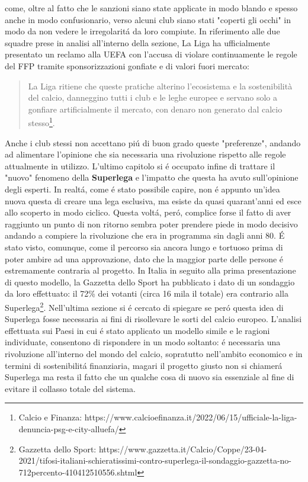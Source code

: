 \documentclass[
    corpo=12pt,
    oneside,
    evenboxes,
    tipotesi=triennale,
    stile=classica,
    oldstyle,
    autoretitolo,
    greek,
]{toptesi}
\begin{document}
\begin{interlinea}{1.5}
come, oltre al fatto che le sanzioni siano state applicate in modo blando e spesso anche in modo confusionario, verso alcuni club siano stati "coperti gli occhi" 
in modo da non vedere le irregolarit\'a da loro compiute. In riferimento alle due squadre prese in analisi all'interno della sezione, La Liga ha ufficialmente
presentato un reclamo alla UEFA con l'accusa di violare continuamente le regole del FFP tramite sponsorizzazioni gonfiate e di valori fuori mercato: \begin{quote}\small
    La Liga ritiene che queste pratiche alterino l’ecosistema e la sostenibilità del calcio, danneggino tutti i club e le leghe europee e servano solo a gonfiare artificialmente il mercato, con denaro non generato dal calcio stesso\footnote{Calcio e Finanza: https://www.calcioefinanza.it/2022/06/15/ufficiale-la-liga-denuncia-psg-e-city-alluefa/}.
\end{quote}
Anche i club stessi non accettano pi\'u di buon grado queste "preferenze", andando ad alimentare l'opinione che sia necessaria una rivoluzione rispetto
alle regole attualmente in utilizzo.\newline
L'ultimo capitolo si \'e occupato infine di trattare il "nuovo" fenomeno della \linebreak \textbf{Superlega} e l'impatto che questa ha avuto sull'opinione
degli esperti. In realt\'a, come \'e stato possibile capire, non \'e appunto un'idea nuova questa di creare una lega esclusiva, ma esiste da 
quasi quarant'anni ed esce allo scoperto in modo ciclico. Questa volt\'a, per\'o, complice forse il fatto di aver raggiunto un punto di non ritorno 
sembra poter prendere piede in modo decisivo andando a compiere la rivoluzione che era in programma sin dagli anni 80. \'E stato visto, comunque,
come il percorso sia ancora lungo e tortuoso prima di poter ambire ad una approvazione, dato che la maggior parte delle persone \'e estremamente contraria 
al progetto. In Italia in seguito alla prima presentazione di questo modello, la Gazzetta dello Sport ha pubblicato i dato di un sondaggio da loro effettuato:
il 72\% dei votanti (circa 16 mila il totale) era contrario alla Superlega\footnote{Gazzetta dello Sport: https://www.gazzetta.it/Calcio/Coppe/23-04-2021/tifosi-italiani-schieratissimi-contro-superlega-il-sondaggio-gazzetta-no-712percento-410412510556.shtml}.
Nell'ultima sezione si \'e cercato di spiegare se per\'o questa idea di Superlega fosse necessaria ai fini di risollevare le sorti del calcio europeo. 
L'analisi effettuata sui Paesi in cui \'e stato applicato un modello simile e le ragioni individuate, consentono di rispondere in un modo soltanto: \'e 
necessaria una rivoluzione all'interno del mondo del calcio, sopratutto nell'ambito economico e in termini di sostenibilit\'a finanziaria, magari 
il progetto giusto non si chiamer\'a Superlega ma resta il fatto che un qualche cosa di nuovo sia essenziale al fine di evitare il collasso totale del sistema.


\end{interlinea}
\end{document}
